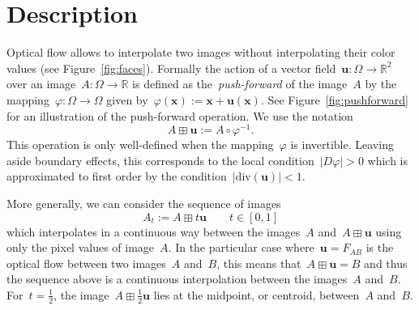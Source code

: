 \documentclass{ipol}
\def\R{\mathbb{R}}
\def\x{\mathbf{x}}
\def\u{\mathbf{u}}
\begin{document}
%
%
%
%
%


\section{Description}

Optical flow allows to interpolate two images without interpolating their
color values (see Figure~\ref{fig:faces}).  Formally the action of a vector
field~$\u:\Omega\to\R^2$ over an image~$A:\Omega\to\R$ is defined as
the~\emph{push-forward} of the image~$A$ by the
mapping~$\varphi:\Omega\to\Omega$ given by~$\varphi(\x):=\x+\u(\x)$.  See
Figure~\ref{fig:pushforward} for an illustration of the push-forward
operation.  We use the notation
\[
A\boxplus\u := A\circ\varphi^{-1}.
\]
This operation is only well-defined when the mapping~$\varphi$ is invertible.
Leaving aside boundary effects, this corresponds to the local
condition~$|D\varphi|>0$ which is approximated to first order by the
condition~$|\mathrm{div}(\u)|<1$.


More generally, we can consider the sequence of images
\[
A_t := A\boxplus t\u\qquad t\in[0,1]
\]
which interpolates in a continuous way between the images~$A$
and~$A\boxplus\u$ using only the pixel values of image~$A$.  In the particular
case where~$\u=F_{AB}$ is the optical flow between two images~$A$ and~$B$, this means
that~$A\boxplus\u=B$ and thus the sequence above is a continuous interpolation
between the images~$A$ and~$B$.  For~$t=\frac{1}{2}$, the
image~$A\boxplus\frac{1}{2}\u$ lies at the midpoint, or centroid, between~$A$
and~$B$.
\end{document}
